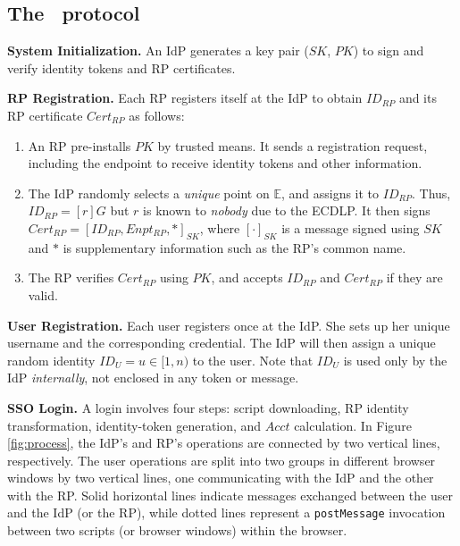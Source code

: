 \subsection{The \usso\ protocol}
\label{implementations}

\noindent \textbf{System Initialization.}
An IdP generates a key pair ($SK$, $PK$) to sign and verify identity tokens and RP certificates.

\vspace{1.5mm}
\noindent\textbf{RP Registration.}
Each RP registers itself at the IdP to obtain $ID_{RP}$ and its RP certificate $Cert_{RP}$ as follows:
\vspace{-\topsep}\begin{enumerate}
\setlength{\topsep}{0pt}
\setlength{\partopsep}{0pt}
\setlength{\itemsep}{0pt}
\setlength{\parsep}{0pt}
\setlength{\parskip}{0pt}
\item
An RP pre-installs $PK$ by trusted means.
It sends a registration request, including the endpoint to receive identity tokens and other information.
\item
The IdP randomly selects a \emph{unique} point on $\mathbb{E}$,
        and assigns it to $ID_{RP}$.
Thus, $ID_{RP} = [r]G$ but $r$ is known to \emph{nobody} due to the ECDLP.
It then signs $Cert_{RP} = [ID_{RP}, Enpt_{RP}, *]_{SK}$,
     where $[\cdot]_{SK}$ is a message signed using $SK$ and $*$ is supplementary information such as the RP's common name.
\item
The RP verifies $Cert_{RP}$ using $PK$, and accepts $ID_{RP}$ and $Cert_{RP}$ if they are valid.
\end{enumerate}


\noindent\textbf{User Registration.}
Each user registers once at the IdP. She sets up her unique username and the corresponding credential.
The IdP will then assign
a unique random identity $ID_U = u \in [1, n)$ to the user.
Note that $ID_U$ is used only by the IdP \emph{internally},
 not enclosed in any token or message.


\vspace{1.5mm}
\noindent\textbf{SSO Login.} A login %
involves four steps: script downloading, RP identity transformation, identity-token generation, and $Acct$ calculation. In Figure \ref{fig:process}, the IdP's and RP's operations are connected by two vertical lines, respectively. The user operations are split into two groups in different browser windows by two vertical lines, one communicating with the IdP and the other with the RP. Solid horizontal lines indicate messages exchanged between the user and the IdP (or the RP), while dotted lines represent a \verb+postMessage+ invocation between two scripts (or browser windows) within the browser.


